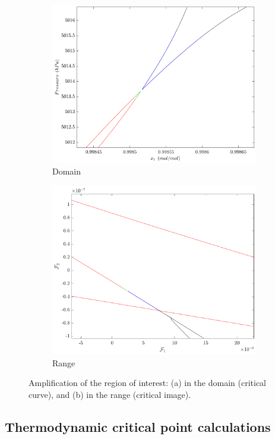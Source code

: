 \documentclass{article}
\theoremstyle{definition}
\theoremstyle{remark}
\begin{document}
\begin{figure}
\centering
\begin{subfigure}{.5\textwidth}
  \centering
  \includegraphics[width=.9\linewidth]{bicos_dominio}
  \caption{Domain}
  \label{fig:sub1}
\end{subfigure}%
\begin{subfigure}{.5\textwidth}
  \centering
  \includegraphics[width=.9\linewidth]{bicos_imagem}
  \caption{Range}
  \label{fig:sub2}
\end{subfigure}
\caption{Amplification of the region of interest: (a) in the domain (critical curve), and (b) in the range (critical image).}
\label{fig:domain_image}
\end{figure}
 
\subsection{Thermodynamic critical point calculations}
\end{document}

